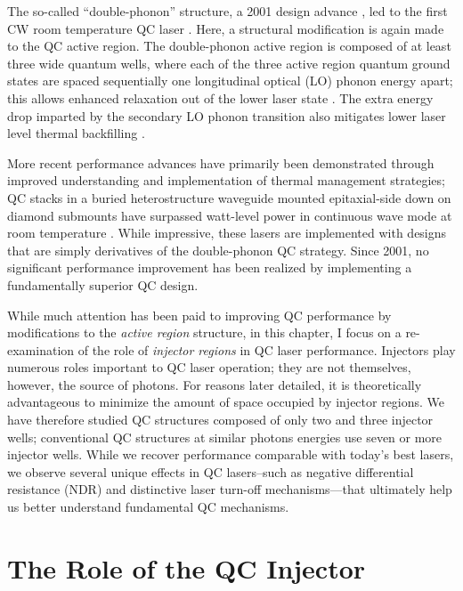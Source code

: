 The so-called ``double-phonon'' structure, a 2001 design advance \cite{Hofstetter:APL:2001:2phonon}, led to the first CW room temperature QC laser \cite{Beck:Science:2002}.  Here, a structural modification is again made to the QC active region.  The double-phonon active region is composed of at least three wide quantum wells, where each of the three active region quantum ground states are spaced sequentially one longitudinal optical (LO) phonon energy apart; this allows enhanced relaxation out of the lower laser state \cite{Beck:Science:2002}.  The extra energy drop imparted by the secondary LO phonon transition also mitigates lower laser level thermal backfilling \cite{Howard:JQE:2008}.

More recent performance advances have primarily been demonstrated through improved understanding and implementation of thermal management strategies; QC stacks in a buried heterostructure waveguide mounted epitaxial-side down on diamond submounts have surpassed watt-level power in continuous wave mode at room temperature \cite{Lyakh:CLEO:2008}.  While impressive, these lasers are implemented with designs that are simply derivatives of the double-phonon QC strategy.  Since 2001, no significant performance improvement has been realized by implementing a fundamentally superior QC design.

While much attention has been paid to improving QC performance by modifications to the \emph{active region} structure, in this chapter, I focus on a re-examination of the role of \emph{injector regions} in QC laser performance.  Injectors play numerous roles important to QC laser operation; they are not themselves, however, the source of photons.  For reasons later detailed, it is theoretically advantageous to minimize the amount of space occupied by injector regions.  We have therefore studied QC structures composed of only two and three injector wells; conventional QC structures at similar photons energies use seven or more injector wells.  While we recover performance comparable with today's best lasers, we observe several unique effects in QC lasers--such as negative differential resistance (NDR) and distinctive laser turn-off mechanisms---that ultimately help us better understand fundamental QC mechanisms.


\section{The Role of the QC Injector}

